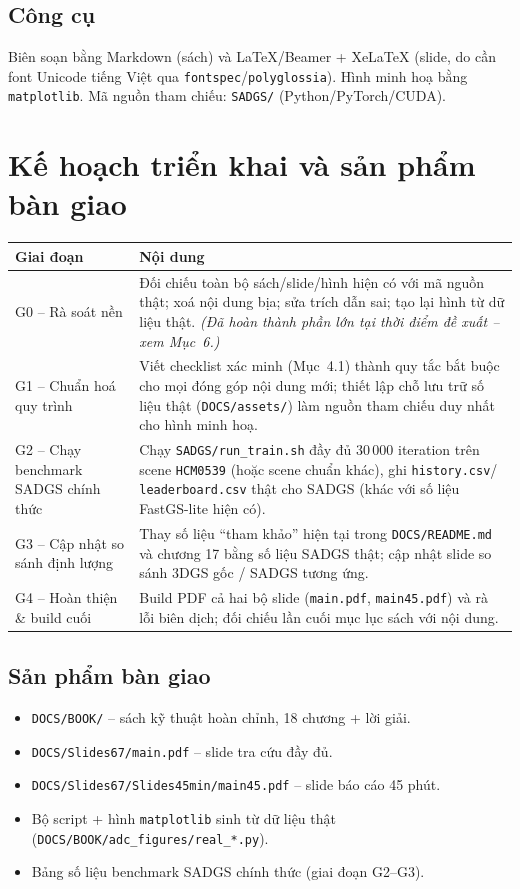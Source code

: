 \documentclass[a4paper,11pt]{article}
\begin{document}
\subsection{Công cụ}
Biên soạn bằng Markdown (sách) và LaTeX/Beamer + XeLaTeX (slide, do cần font Unicode tiếng
Việt qua \texttt{fontspec}/\texttt{polyglossia}). Hình minh hoạ bằng \texttt{matplotlib}. Mã
nguồn tham chiếu: \texttt{SADGS/} (Python/PyTorch/CUDA).

\section{Kế hoạch triển khai và sản phẩm bàn giao}

\begin{longtable}{@{}>{\raggedright\arraybackslash}p{3.6cm} p{9.5cm}@{}}
\toprule
\textbf{Giai đoạn} & \textbf{Nội dung} \\
\midrule
\endhead
G0 -- Rà soát nền & Đối chiếu toàn bộ sách/slide/hình hiện có với mã nguồn thật; xoá nội dung
bịa; sửa trích dẫn sai; tạo lại hình từ dữ liệu thật. \emph{(Đã hoàn thành phần lớn tại thời
điểm đề xuất -- xem Mục~6.)} \\
G1 -- Chuẩn hoá quy trình & Viết checklist xác minh (Mục~4.1) thành quy tắc bắt buộc cho mọi
đóng góp nội dung mới; thiết lập chỗ lưu trữ số liệu thật (\texttt{DOCS/assets/}) làm nguồn
tham chiếu duy nhất cho hình minh hoạ. \\
G2 -- Chạy benchmark SADGS chính thức & Chạy \texttt{SADGS/run\_train.sh} đầy đủ 30\,000
iteration trên scene \texttt{HCM0539} (hoặc scene chuẩn khác), ghi \texttt{history.csv}/
\texttt{leaderboard.csv} thật cho SADGS (khác với số liệu FastGS-lite hiện có). \\
G3 -- Cập nhật so sánh định lượng & Thay số liệu ``tham khảo'' hiện tại trong
\texttt{DOCS/README.md} và chương 17 bằng số liệu SADGS thật; cập nhật slide so sánh
3DGS gốc / SADGS tương ứng. \\
G4 -- Hoàn thiện \& build cuối & Build PDF cả hai bộ slide (\texttt{main.pdf},
\texttt{main45.pdf}) và rà lỗi biên dịch; đối chiếu lần cuối mục lục sách với nội dung. \\
\bottomrule
\end{longtable}

\subsection{Sản phẩm bàn giao}
\begin{itemize}[leftmargin=1.2em]
    \item \texttt{DOCS/BOOK/} -- sách kỹ thuật hoàn chỉnh, 18 chương + lời giải.
    \item \texttt{DOCS/Slides67/main.pdf} -- slide tra cứu đầy đủ.
    \item \texttt{DOCS/Slides67/Slides45min/main45.pdf} -- slide báo cáo 45 phút.
    \item Bộ script + hình \texttt{matplotlib} sinh từ dữ liệu thật (\texttt{DOCS/BOOK/adc\_figures/real\_*.py}).
    \item Bảng số liệu benchmark SADGS chính thức (giai đoạn G2--G3).
\end{itemize}
\end{document}
